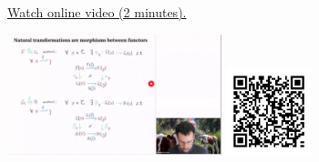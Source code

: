
\begin{minipage}{10cm}
    \href{https://act4e-spring21.netlify.app/spring2021-nat-trafos:natural-trafos:nattrafos-as-mor.html}{Watch online video (2 minutes).}
        
    \href{https://act4e-spring21.netlify.app/spring2021-nat-trafos:natural-trafos:nattrafos-as-mor.html}{\includegraphics[height=3.5cm]{spring2021-nat-trafos:natural-trafos:nattrafos-as-mor/thumbnails.jpg}}
    \href{https://act4e-spring21.netlify.app/spring2021-nat-trafos:natural-trafos:nattrafos-as-mor.html}{\includegraphics[height=2.5cm]{spring2021-nat-trafos:natural-trafos:nattrafos-as-mor/qrcode.png}}
\end{minipage}
